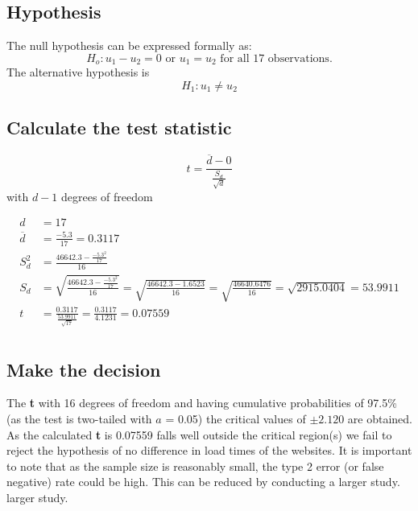 \documentclass[12pt]{report}
\begin{document}
\subsection{Hypothesis}
The null hypothesis can be expressed formally as:
\[ H_o: u_1 - u_2 = 0 \text{ or } u_1 = u_2 \text{ for all 17 observations.}\]
The alternative hypothesis is
\[H_1: u_1 \neq u_2\]

\subsection{Calculate the test statistic}

\[t = \frac{\overline{d} - 0}{\frac{S_d}{\sqrt{d}}}\]
with \(d - 1\) degrees of freedom

\begin{align*}
d &= 17\\
\overline{d} &= \frac{-5.3}{17} = 0.3117\\
S^2_d &= \frac{46642.3 - \frac{-5.3^2}{17}}{16}\\
S_d &= \sqrt{\frac{46642.3 - \frac{-5.3^2}{17}}{16}}
= \sqrt{\frac{46642.3 - 1.6523}{16}}
= \sqrt{\frac{46640.6476}{16}}
= \sqrt{2915.0404}
= 53.9911\\
t &= \frac{0.3117}{\frac{53.9911}{\sqrt{17}}}
= \frac{0.3117}{4.1231}
= 0.07559\\
\end{align*}


\subsection{Make the decision}
The \textbf{t} with 16 degrees of freedom and having cumulative probabilities of 97.5\% (as the test is two-tailed with \(a\) = 0.05) the critical values of \(\pm2.120\) are obtained.  As the calculated \textbf{t} is 0.07559 falls well outside the critical region(s) we fail to reject the hypothesis of no difference in load times of the websites. It is important to note that as the sample size is reasonably small, the type 2 error (or false negative) rate could be high.  This can be reduced by conducting a larger study.
larger study. 
\end{document}
